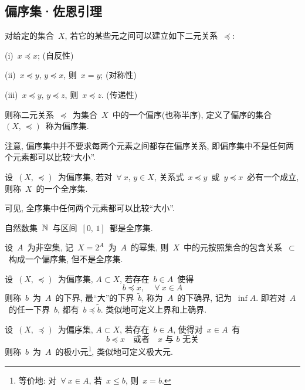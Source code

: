\subsection*{偏序集·佐恩引理}

\begin{definition}
对给定的集合~$X$, 若它的某些元之间可以建立如下二元关系~$\preceq$:

(i)\ $x \preccurlyeq x$; (自反性)

(ii)\ $x \preccurlyeq y, \, y \preccurlyeq x$, 则~$x = y$; (对称性)

(iii)\ $x \preccurlyeq y, \, y \preccurlyeq z$, 则~$x \preccurlyeq z$. (传递性)

则称二元关系~$\preccurlyeq$~为集合~$X$~中的一个偏序(也称半序), 定义了偏序的集合~$(X,\,\preccurlyeq)$~称为偏序集.
\end{definition}

注意, 偏序集中并不要求每两个元素之间都存在偏序关系, 即偏序集中不是任何两个元素都可以比较``大小''.

\begin{definition}
设~$(X,\,\preccurlyeq)$~为偏序集, 若对~$\forall~x,\,y \in X$, 关系式~$x \preccurlyeq y$~或~$y \preccurlyeq x$~必有一个成立, 则称~$X$~的一个全序集.
\end{definition}

可见, 全序集中任何两个元素都可以比较``大小''.

\medskip

\begin{example}
自然数集~$\mathbb{N}$~与区间~$[0,\,1]$~都是全序集.
\end{example}

\medskip

\begin{example}
设~$A$~为非空集, 记~$X=2^A$~为~$A$~的幂集, 则~$X$~中的元按照集合的包含关系~$\subset$~构成一个偏序集,
但不是全序集.
\end{example}

\medskip

\begin{definition}
设~$(X,\,\preccurlyeq)$~为偏序集, $A \subset X$, 若存在~$b \in A$~使得
\[
b \preccurlyeq x, \, \quad \forall~x \in A
\]
则称~$b$~为~$A$~的下界, 最``大''的下界~$\tilde{b}$, 称为~$A$~的下确界, 记为~$\inf A$. 即若对~$A$~的任一下界~$b$, 都有~$b \preccurlyeq \tilde{b}$. 类似地可定义上界和上确界.
\end{definition}

\begin{definition}
设~$(X,\,\preccurlyeq)$~为偏序集, $A \subset X$, 若存在~$b \in A$, 使得对~$x \in A$~有
\[
b \preccurlyeq x \quad \mbox{或者} \quad  x \mbox{~与~} b \mbox{~无关}
\]
则称~$b$~为~$A$~的极小元\footnote{等价地: 对~$\forall~x \in A$, 若~$x \leqslant b$, 则~$x = b$.}, 类似地可定义极大元.
\end{definition}

